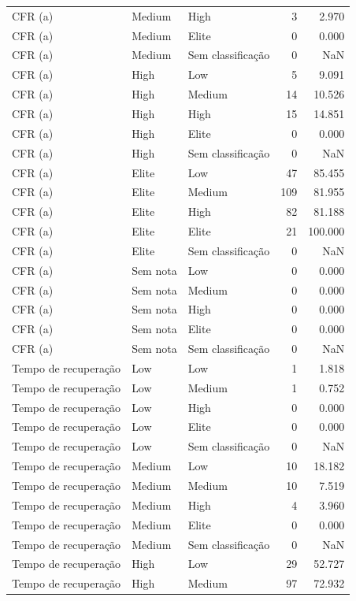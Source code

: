 \begin{tabular}{lllrr}
CFR (a) & Medium & High & 3 & 2.970 \\
CFR (a) & Medium & Elite & 0 & 0.000 \\
CFR (a) & Medium & Sem classificação & 0 & NaN \\
CFR (a) & High & Low & 5 & 9.091 \\
CFR (a) & High & Medium & 14 & 10.526 \\
CFR (a) & High & High & 15 & 14.851 \\
CFR (a) & High & Elite & 0 & 0.000 \\
CFR (a) & High & Sem classificação & 0 & NaN \\
CFR (a) & Elite & Low & 47 & 85.455 \\
CFR (a) & Elite & Medium & 109 & 81.955 \\
CFR (a) & Elite & High & 82 & 81.188 \\
CFR (a) & Elite & Elite & 21 & 100.000 \\
CFR (a) & Elite & Sem classificação & 0 & NaN \\
CFR (a) & Sem nota & Low & 0 & 0.000 \\
CFR (a) & Sem nota & Medium & 0 & 0.000 \\
CFR (a) & Sem nota & High & 0 & 0.000 \\
CFR (a) & Sem nota & Elite & 0 & 0.000 \\
CFR (a) & Sem nota & Sem classificação & 0 & NaN \\
Tempo de recuperação & Low & Low & 1 & 1.818 \\
Tempo de recuperação & Low & Medium & 1 & 0.752 \\
Tempo de recuperação & Low & High & 0 & 0.000 \\
Tempo de recuperação & Low & Elite & 0 & 0.000 \\
Tempo de recuperação & Low & Sem classificação & 0 & NaN \\
Tempo de recuperação & Medium & Low & 10 & 18.182 \\
Tempo de recuperação & Medium & Medium & 10 & 7.519 \\
Tempo de recuperação & Medium & High & 4 & 3.960 \\
Tempo de recuperação & Medium & Elite & 0 & 0.000 \\
Tempo de recuperação & Medium & Sem classificação & 0 & NaN \\
Tempo de recuperação & High & Low & 29 & 52.727 \\
Tempo de recuperação & High & Medium & 97 & 72.932 \\

\end{tabular}
